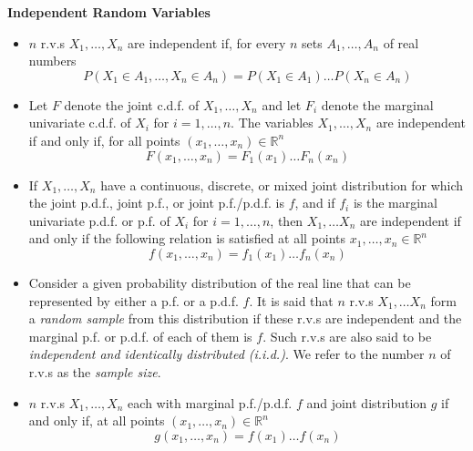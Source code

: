 \documentclass[11pt]{article}
\begin{document}
\textbf{Independent Random Variables}
\begin{itemize}
    \item $n$ r.v.s $X_1, \ldots, X_n$ are independent if, for every $n$ sets $A_1, \ldots, 
    A_n$ of real numbers 
    \[P(X_1 \in A_1, \ldots, X_n \in A_n) = P(X_1 \in A_1) \ldots P(X_n \in A_n)\]
    \item Let $F$ denote the joint c.d.f. of $X_1, \ldots, X_n$ and let $F_i$ denote the 
    marginal univariate c.d.f. of $X_i$ for $i = 1, \ldots, n$. The variables $X_1, \ldots, 
    X_n$ are independent if and only if, for all points $(x_1, \ldots, x_n) \in \mathbb{R}^n$
    \[F(x_1, \ldots, x_n) = F_1(x_1) \ldots F_n(x_n)\]
    \item If $X_1, \ldots, X_n$ have a continuous, discrete, or mixed joint distribution for 
    which the joint p.d.f., joint p.f., or joint p.f./p.d.f. is $f$, and if $f_i$ is the 
    marginal univariate p.d.f. or p.f. of $X_i$ for $i = 1, \ldots, n$, then $X_1, \ldots X_n$
    are independent if and only if the following relation is satisfied at all points $x_1, 
    \ldots, x_n \in \mathbb{R}^n$
    \[f(x_1, \ldots, x_n)=f_1(x_1) \ldots f_n(x_n)\]
    \item Consider a given probability distribution of the real line that can be represented 
    by either a p.f. or a p.d.f. $f$. It is said that $n$ r.v.s $X_1, \ldots X_n$ form a 
    \textit{random sample} from this distribution if these r.v.s are independent and the 
    marginal p.f. or p.d.f. of each of them is $f$. Such r.v.s are also said to be \textit{
    independent and identically distributed (i.i.d.)}. We refer to the number $n$ of r.v.s as 
    the \textit{sample size}.
    \item $n$ r.v.s $X_1, \ldots, X_n$ each with marginal p.f./p.d.f. $f$ and joint 
    distribution $g$ if and only if, at all points $(x_1, \ldots, x_n) \in \mathbb{R}^n$
    \[g(x_1, \ldots, x_n) = f(x_1) \ldots f(x_n)\]
    

\end{itemize}
\end{document}
